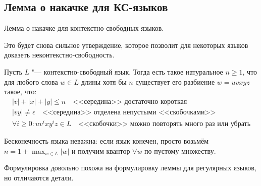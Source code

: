 
\subsection{Лемма о накачке для КС-языков}
Лемма о накачке для контекстно-свободных языков.

Это будет снова сильное утверждение, которое позволит для некоторых языков
доказеть неконтекстно-свободность.

\begin{lemma}
    Пусть $L$ "--- контекстно-свободный язык.
    Тогда есть такое натуральное $n\ge 1$, что для любого слова $w \in L$ длины хотя бы $n$
    существует его разбиение $w=uvxyz$ такое, что:
    \begin{gather*}
        |v| + |x| + |y| \le n \quad \text{<<середина>> достаточно короткая}\\
        |vy| \neq \epsilon \quad \text{<<середина>> отделена непустыми <<скобочками>>}\\
        \forall i \ge 0 \colon uv^ixy^iz \in L \quad \text{<<скобочки>> можно повторять много раз или убрать}
    \end{gather*}
\end{lemma}
\begin{Rem}
    Бесконечность языка неважна: если язык конечен, просто возьмём $n=1+\max_{w\in L} |w|$
    и получим квантор $\forall w$ по пустому множеству.
\end{Rem}
\begin{Rem}
    Формулировка довольно похожа на формулировку леммы для регулярных языков, но отличаются детали.
\end{Rem}
